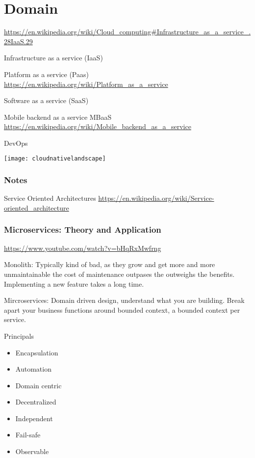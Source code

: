 \chapter{Domain}


\url{https://en.wikipedia.org/wiki/Cloud_computing#Infrastructure_as_a_service_.28IaaS.29}

Infrastructure as a service  (IaaS)

Platform as a service (Paas) \url{https://en.wikipedia.org/wiki/Platform_as_a_service}

Software as a service (SaaS)

Mobile backend as a service MBaaS \url{https://en.wikipedia.org/wiki/Mobile_backend_as_a_service}

DevOps

\texttt{[image: cloudnativelandscape]}




\subsection*{Notes}
Service Oriented Architectures \url{https://en.wikipedia.org/wiki/Service-oriented_architecture}


\subsection{Microservices: Theory and Application}
\url{https://www.youtube.com/watch?v=bHqRxMwfrng}

Monolith:
Typically kind of bad, as they grow and get more and more unmaintainable the cost of maintenance outpases the outweighs the benefits. Implementing a new feature takes a long time.

Mircroservices:
Domain driven design, understand what you are building. Break apart your business functions around bounded context, a bounded context per service.


Principals

\begin{itemize}
\item Encapsulation
\item Automation
\item Domain centric
\item Decentralized
\item Independent
\item Fail-safe
\item Observable
\end{itemize}

